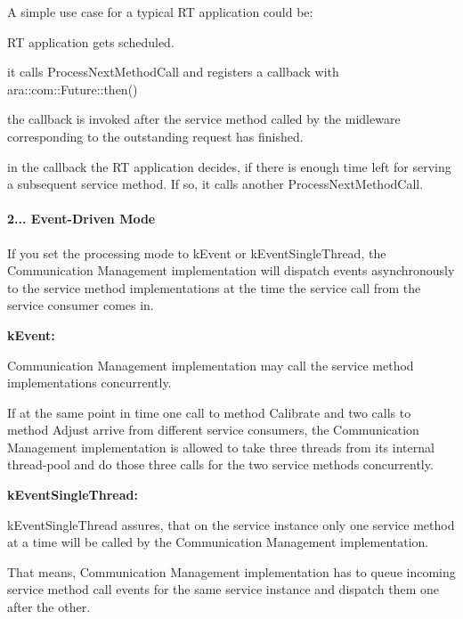 \begin{DoxyItemize}
\item A simple use case for a typical RT application could be\+:
\begin{DoxyItemize}
\item RT application gets scheduled.
\item it calls Process\+Next\+Method\+Call and registers a callback with ara\+::com\+::\+Future\+::then()
\item the callback is invoked after the service method called by the midleware corresponding to the outstanding request has finished.
\item in the callback the RT application decides, if there is enough time left for serving a subsequent service method. If so, it calls another Process\+Next\+Method\+Call.
\end{DoxyItemize}
\end{DoxyItemize}

\paragraph*{2... Event-\/\+Driven Mode}


\begin{DoxyItemize}
\item If you set the processing mode to k\+Event or k\+Event\+Single\+Thread, the Communication Management implementation will dispatch events asynchronously to the service method implementations at the time the service call from the service consumer comes in.
\begin{DoxyItemize}
\item {\bfseries k\+Event\+:}
\begin{DoxyItemize}
\item Communication Management implementation may call the service method implementations concurrently.
\item If at the same point in time one call to method Calibrate and two calls to method Adjust arrive from different service consumers, the Communication Management implementation is allowed to take three threads from its internal thread-\/pool and do those three calls for the two service methods concurrently.
\end{DoxyItemize}
\item {\bfseries k\+Event\+Single\+Thread\+:}
\begin{DoxyItemize}
\item k\+Event\+Single\+Thread assures, that on the service instance only one service method at a time will be called by the Communication Management implementation.
\item That means, Communication Management implementation has to queue incoming service method call events for the same service instance and dispatch them one after the other.
\end{DoxyItemize}
\end{DoxyItemize}
\end{DoxyItemize}

